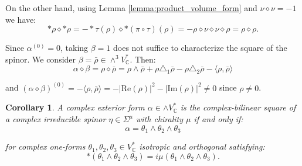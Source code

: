 \documentclass[10pt,a4paper,twoside,reqno]{amsart}
\theoremstyle{plain}
\newtheorem{cor}[thm]{Corollary}
\theoremstyle{definition}
\theoremstyle{remark}
\def\C{\mathbb{C}}
\def\Re{\mathrm{Re}}
\def\Im{\mathrm{Im}}
\newcommand{\abs}[1]{\left\lvert#1\right\rvert}
\newcommand{\escal}[1]{\langle#1\rangle}
\begin{document}
\noindent
On the other hand, using Lemma \ref{lemma:product_volume_form} and $\nu\diamond\nu=-1$ we have: 
\begin{equation*}
*\rho\diamond*\rho=-*\tau(\rho)\diamond*(\pi\circ\tau)(\rho)=-\rho\diamond\nu\diamond\nu\diamond\rho=\rho\diamond\rho.
\end{equation*}

\noindent
Since $\alpha^{(0)}=0$, taking $\beta=1$ does not suffice to characterize the square of the spinor. We consider $\beta = \bar \rho \in \wedge^3V^*_\C$. Then:
\begin{equation*}
\alpha\diamond\beta=\rho\diamond\bar\rho=\rho\wedge\bar\rho+\rho\triangle_1\bar\rho-\rho\triangle_2\bar\rho-\escal{\rho,\bar\rho}  
\end{equation*}

\noindent
and $(\alpha\diamond\beta)^{(0)}=-\escal{\rho,\bar\rho}=-\abs{\Re(\rho)}^2-\abs{\Im(\rho)}^2\neq0$ since $\rho\neq 0$.

\begin{cor}
\label{cor:6dbilinear}
A complex exterior form $\alpha\in\wedge V^*_\C$ is the complex-bilinear square of a complex irreducible spinor $\eta\in\Sigma^\mu$ with chirality $\mu$ if and only if: 
\begin{equation*}
\alpha=\theta_1\wedge\theta_2\wedge\theta_3    
\end{equation*}

\noindent
for complex one-forms $\theta_1,\theta_2,\theta_3\in V^*_\C$ isotropic and orthogonal satisfying: 
\begin{equation*}
*(\theta_1\wedge\theta_2\wedge\theta_3)=i\mu(\theta_1\wedge\theta_2\wedge\theta_3).
\end{equation*}
\end{cor}
\end{document}
